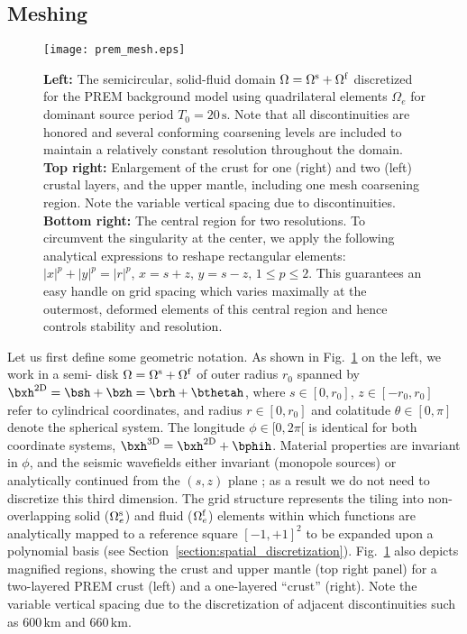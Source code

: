 \subsection{Meshing}
\begin{figure*}[htb!]
\begin{center}
\texttt{[image: prem\_mesh.eps]}
\caption{\textbf{Left:} The semicircular, solid-fluid
domain $\Omega=\Omega^{\rm s} + \Omega^{\rm f}$
discretized for the PREM background model using
quadrilateral elements $\Omega_e$ for dominant source period $T_0=20\, \textrm{s}$.
Note that all discontinuities are honored and several
conforming coarsening levels are included to maintain a relatively
constant resolution throughout the domain.
\textbf{Top right:} Enlargement of the crust for one (right) and two (left) crustal
layers, and the upper mantle, including one mesh coarsening region.
Note the variable vertical spacing due to discontinuities.
\textbf{Bottom right:} The central region for two resolutions.
To circumvent the singularity at the center,
we apply the following analytical expressions to reshape rectangular elements:
$\left|{x}\right|^p+\left|{y}\right|^p=\left|{r}\right|^p$,
$x=s+z,\,y=s-z,\,1\le p \le 2$.
This guarantees an easy handle on grid spacing which varies maximally
at the outermost, deformed elements of this central region and hence
controls stability and resolution.}
\label{img:prem_mesh}
\end{center}
\end{figure*}

Let us first define some geometric notation. As shown in
Fig.~\ref{img:prem_mesh} on the left, we work in a semi- disk
$\Omega=\Omega^{\rm s} + \Omega^{\rm f}$ of outer
radius $r_0$ spanned by $\bxh^{\rm 2D}=\bsh + \bzh=\brh+\bthetah$,
where $s\in [0,r_0]$, $z\in [-r_0,r_0]$ refer to cylindrical coordinates, and
radius $r\in [0,r_0]$ and colatitude $\theta\in [0,\pi]$ denote the spherical system.
The longitude $\phi\in [0,2\pi[$ is identical for both coordinate systems,
$\bxh^{\rm 3D}=\bxh^{\rm 2D}+\bphih$.  Material properties are invariant in
$\phi$, and the seismic wavefields either invariant (monopole sources) or analytically
continued from the $(s,z)$ plane \citep{nissen+:07a}; as a result we do not need
to discretize this third dimension. The grid structure represents the tiling into
non-overlapping solid ($\Omega_e^{\rm s}$) and fluid ($\Omega_e^{\rm f}$)
elements within which functions are analytically mapped to a reference square
$[-1,+1]^2$ to be expanded upon a polynomial basis
(see Section~\ref{section:spatial_discretization}).
Fig.~\ref{img:prem_mesh} also depicts magnified regions, showing
the crust and upper mantle (top right panel) for a two-layered PREM \citep{prem}
crust (left) and a one-layered ``crust'' (right). Note the variable vertical spacing due to the
discretization of adjacent discontinuities such as $600\,\textrm{km}$ and
$660\, \textrm{km}$.

